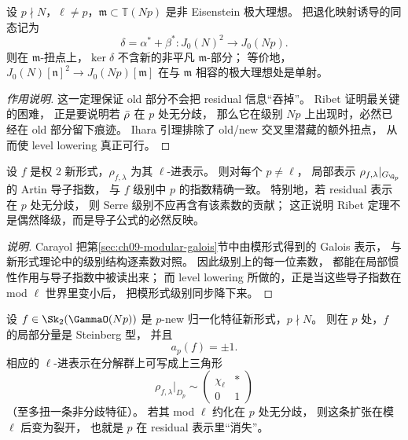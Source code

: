 \begin{theorem}
\label{thm:ch09-ihara-lemma}
设 $p\nmid N$，$\ell\neq p$，$\mathfrak m\subset \mathbb T(Np)$ 是非 Eisenstein 极大理想。
把退化映射诱导的同态记为
\[
  \delta=\alpha^*+\beta^*\colon J_0(N)^2\to J_0(Np).
\]
则在 $\mathfrak m$-扭点上，$\ker \delta$ 不含新的非平凡 $\mathfrak m$-部分；
等价地，$J_0(N)[\mathfrak n]^2\to J_0(Np)[\mathfrak m]$ 在与 $\mathfrak m$ 相容的极大理想处是单射。
\end{theorem}

\begin{proof}[作用说明]
这一定理保证 old 部分不会把 residual 信息“吞掉”。
Ribet 证明最关键的困难，
正是要说明若 $\bar{\rho}$ 在 $p$ 处无分歧，
那么它在级别 $Np$ 上出现时，必然已经在 old 部分留下痕迹。
Ihara 引理排除了 old/new 交叉里潜藏的额外扭点，
从而使 level lowering 真正可行。
\end{proof}

\begin{proposition}
\label{prop:ch09-carayol-conductor}
设 $f$ 是权 $2$ 新形式，$\rho_{f,\lambda}$ 为其 $\ell$-进表示。
则对每个 $p\neq \ell$，
局部表示 $\rho_{f,\lambda}|_{G_{\Q_p}}$ 的 Artin 导子指数，
与 $f$ 级别中 $p$ 的指数精确一致。
特别地，若 residual 表示在 $p$ 处无分歧，
则 Serre 级别不应再含有该素数的贡献；
这正说明 Ribet 定理不是偶然降级，而是导子公式的必然反映。
\end{proposition}

\begin{proof}[说明]
Carayol 把第\ref{sec:ch09-modular-galois}节中由模形式得到的 Galois 表示，
与新形式理论中的级别结构逐素数对照。
因此级别上的每一位素数，
都能在局部惯性作用与导子指数中被读出来；
而 level lowering 所做的，正是当这些导子指数在 mod $\ell$ 世界里变小后，
把模形式级别同步降下来。
\end{proof}

\begin{proposition}
\label{prop:ch09-steinberg-local}
设 $f\in \Sk_2(\GammaO(Np))$ 是 $p$-new 归一化特征新形式，$p\nmid N$。
则在 $p$ 处，$f$ 的局部分量是 Steinberg 型，
并且
\[
  a_p(f)=\pm 1.
\]
相应的 $\ell$-进表示在分解群上可写成上三角形
\[
  \rho_{f,\lambda}|_{D_p}\sim
  \begin{pmatrix}
    \chi_\ell & *\\ 0 & 1
  \end{pmatrix}
\]
（至多扭一条非分歧特征）。
若其 mod $\ell$ 约化在 $p$ 处无分歧，
则这条扩张在模 $\ell$ 后变为裂开，
也就是 $p$ 在 residual 表示里“消失”。
\end{proposition}

